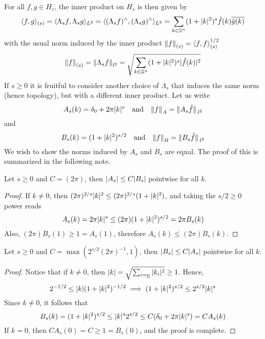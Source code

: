 \documentclass[../main-v2-manifolds.tex]{subfiles}
\begin{document}
For all $f,g\in H_s$, the inner product on $H_s$ is then given by 
\begin{equation}
\langle f,g\rangle_{(s)} = \langle \Lambda_s f,\Lambda_s g\rangle_{L^2} = \langle (\Lambda_s f)^{\wedge},(\Lambda_s g)^\wedge\rangle_{L^2}=\sum_{k\in\mathbb{Z}^n}(1+\vert {k} \vert^2)^{s}\hat{f}(k)\overline{\hat{g}(k)} 
\label{eq: sobolev hs l2 inner product folland}
\end{equation}
with the usual norm induced by the inner product $\norm{f}_{(s)} = \langle f,f\rangle_{(s)}^{1/2}$ 
\begin{equation}
\norm{f}_{(s)}=\norm{\Lambda_s f}_{l^2} =\sqrt{\sum_{k\in\mathbb{Z}^n} (1+\vert {k} \vert^2)^s\vert\hat{f}(k)\vert^2}
\label{eq: sobolev hs l2 norm folland}
\end{equation}
If $s\geq 0$ it is fruitful to consider another choice of $\Lambda_s$ that induces the same norm (hence topology), but with a different inner product. Let us write 
\begin{equation}
    A_s(k) = \delta_0 + 2\pi \abs{k}^s\qqtext{and} \norm{f}_{A} = \norm*{A_s\hat{f}}_{l^2}
    \label{eq:periodic sobolev spaces As}
\end{equation}
and
\begin{equation}
    B_s(k) = (1+\abs{k}^2)^{s/2}\qqtext{and} \norm{f}_{B} = \norm*{B_s\hat{f}}_{l^2}
    \label{eq:periodic sobolev spaces Bs}
\end{equation}
We wish to show the norms induced by $A_s$ and $B_s$ are equal. The proof of this is summarized in the following note.
\begin{note}
\begin{lemma}
    Let $s\geq 0$ and $C = (2\pi)$, then $\vert {A_s} \vert\leq C\vert {B_s} \vert$ pointwise for all $k$.
\end{lemma}    
\begin{proof}
    If $k\neq 0$, then $(2\pi)^{2/s}\vert {k} \vert^2\leq (2\pi)^{2/s}(1+\vert {k} \vert^2)$, and taking the $s/2\geq 0$ power reads
    \[  
        A_s(k)=2\pi\vert {k} \vert^s\leq (2\pi)(1+\vert {k} \vert^2)^{s/2}=2\pi B_s(k)
    \]
    Also, $(2\pi) B_s(1)\geq 1=A_s(1)$, therefore $A_s(k)\leq (2\pi)B_s(k)$.
\end{proof}
\begin{lemma}
    Let $s\geq 0$ and $C = \max(2^{s/2}(2\pi)^{-1},1)$, then $\vert {B_s} \vert\leq C\vert {A_s} \vert$ pointwise for all $k$.
\end{lemma}
\begin{proof}
    Notice that if $k\neq 0$, then $\vert {k} \vert=\sqrt{\sum_{i=\underline{n}}\vert {k_i} \vert^2} \geq 1$. Hence,
    \[
        2^{-1/2}\leq\vert {k} \vert(1+\vert {k} \vert^2)^{-1/2}\implies (1+\vert {k} \vert^2)^{s/2} \leq 2^{s/2}\vert {k} \vert^s
    \]
    Since $k\neq 0$, it follows that 
    \[
    B_s(k)=(1+\vert {k} \vert^2)^{s/2}\leq \vert {k} \vert^s 2^{s/2}\leq C(\delta_0 + 2\pi\vert {k} \vert^s)= CA_s(k)
    \]
    If $k=0$, then $CA_s(0)=C\geq 1 = B_s(0)$, and the proof is complete.
\end{proof}
\end{note}
\end{document}

